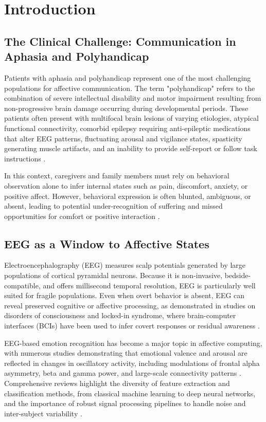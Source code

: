 \section{Introduction}

\subsection{The Clinical Challenge: Communication in Aphasia and Polyhandicap}

Patients with aphasia and polyhandicap represent one of the most challenging populations for affective communication. The term "polyhandicap" refers to the combination of severe intellectual disability and motor impairment resulting from non-progressive brain damage occurring during developmental periods. These patients often present with multifocal brain lesions of varying etiologies, atypical functional connectivity, comorbid epilepsy requiring anti-epileptic medications that alter EEG patterns, fluctuating arousal and vigilance states, spasticity generating muscle artifacts, and an inability to provide self-report or follow task instructions \cite{mikolajewska2014noninvasive_bci, schiff2024bci_comms}.

In this context, caregivers and family members must rely on behavioral observation alone to infer internal states such as pain, discomfort, anxiety, or positive affect. However, behavioral expression is often blunted, ambiguous, or absent, leading to potential under-recognition of suffering and missed opportunities for comfort or positive interaction \cite{pan2018emotion_doc}.

\subsection{EEG as a Window to Affective States}

Electroencephalography (EEG) measures scalp potentials generated by large populations of cortical pyramidal neurons. Because it is non-invasive, bedside-compatible, and offers millisecond temporal resolution, EEG is particularly well suited for fragile populations. Even when overt behavior is absent, EEG can reveal preserved cognitive or affective processing, as demonstrated in studies on disorders of consciousness and locked-in syndrome, where brain-computer interfaces (BCIs) have been used to infer covert responses or residual awareness \cite{galiotta2022eeg_bci_doc, he2022bci_doc, lesenfants2015lockedin}.

EEG-based emotion recognition has become a major topic in affective computing, with numerous studies demonstrating that emotional valence and arousal are reflected in changes in oscillatory activity, including modulations of frontal alpha asymmetry, beta and gamma power, and large-scale connectivity patterns \cite{liu2024graph_eeg_emotion, gkintoni2025systematic, zhang2024challenges}. Comprehensive reviews highlight the diversity of feature extraction and classification methods, from classical machine learning to deep neural networks, and the importance of robust signal processing pipelines to handle noise and inter-subject variability \cite{dhuli2022tutorial, pillalamarri2025multimodal}.

